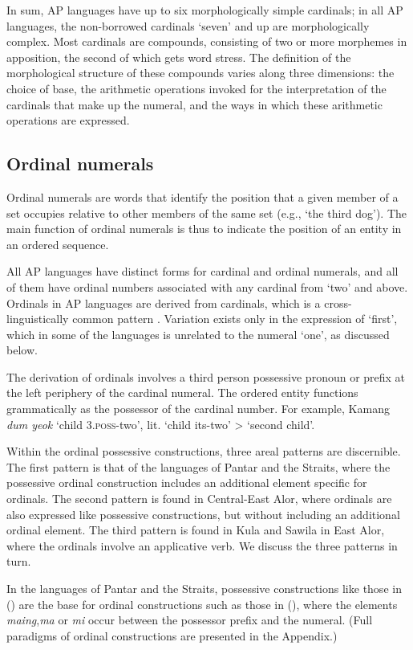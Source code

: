 In sum, AP languages have up to six morphologically simple cardinals; in all AP languages, the non-borrowed cardinals `seven' and up are morphologically complex. Most cardinals are compounds, consisting of two or more morphemes in apposition, the second of which gets word stress. The definition of the morphological structure of these compounds varies along three dimensions: the choice of base, the arithmetic operations invoked for the interpretation of the cardinals that make up the numeral, and the ways in which these arithmetic operations are expressed.

\subsection{{Ordinal numerals}}
Ordinal numerals are words that identify the position that a given member of a set occupies relative to other members of the same set (e.g., `the third dog'). The main function of ordinal numerals is thus to indicate the position of an entity in an ordered sequence.

All AP languages have distinct forms for cardinal and ordinal numerals, and all of them have ordinal numbers associated with any cardinal from `two' and above. Ordinals in AP languages are derived from cardinals, which is a cross-linguistically common pattern \citep{StolzEtAl2013}. Variation exists only in the expression of `first', which in some of the languages is unrelated to the numeral `one', as discussed below.

The derivation of ordinals involves a third person possessive pronoun or prefix at the left periphery of the cardinal numeral. The ordered entity functions grammatically as the possessor of the cardinal number. For example, Kamang \textit{dum yeok} `child 3.\textsc{poss}{}-two', lit. `child its-two' {\textgreater} `second child'.

Within the ordinal possessive constructions, three areal patterns are discernible. The first pattern is that of the languages of Pantar and the Straits, where the possessive ordinal construction includes an additional element specific for ordinals. The second pattern is found in Central-East Alor, where ordinals are also expressed like possessive constructions, but without including an additional ordinal element. The third pattern is found in Kula and Sawila in East Alor, where the ordinals involve an applicative verb. We discuss the three patterns in turn.

In the languages of Pantar and the Straits, possessive constructions like those in () are the base for ordinal constructions such as those in (), where the elements \textit{maing},\textit{ma} or \textit{mi} occur between the possessor prefix and the numeral. (Full paradigms of ordinal constructions are presented in the Appendix.)

